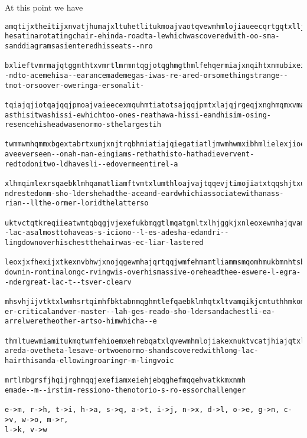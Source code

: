 At this point we have
  \begin{Verbatim}[frame=single,fontsize=\tiny]
amqtijxtheitijxnvatjhumajxltuhetlitukmoajvaotqvewmhmlojiaueecqrtgqtxlljtnhtrqtqjmximhmlajqqmtiqgbxhe
hesatinarotatingchair-ehinda-roadta-lewhichwascoveredwith-oo-sma-sanddiagramsasienteredhisseats--nro

bxlieftvmrmajqtggmthtxvmrtlmrmntqgjotqghmgthmlfehqermiajxnqihtxnmubixeifehqeewmhgeomhjxntgmhqextkjis
-ndto-acemehisa--earancemademegas-iwas-re-ared-orsomethingstrange--tnot-orsoover-oweringa-ersonalit-

tqiajqjiotqajqqjpmoajvaieecexmquhmtiatotsajqqjpmtxlajqjrgeqjxnghmqmxvmajqamtlotqmxehrebqiamkthnmqija
asthisitwashissi-ewhichtoo-ones-reathawa-hissi-eandhisim-osing-resencehisheadwasenormo-sthelargestih

twmmwmhqmmxbgextabrtxumjxnjtrqbhmiatiajqiegatiatljmwmhwmxibhmlielexjioebklatwmqkjggmlewmhrmmxijhmkst
aveeverseen--onah-man-eingiams-rethathisto-hathadievervent-redtodonitwo-ldhavesli--edovermeentirel-a

xlhmqimlexrsqaebklmhqamatliamftvmtxlumthloajvajtqqevjtimojiatxtqqshjtxubkkiamfehrmhfkehjliamktiimhqe
ndrestedonm-sho-ldershehadthe-aceand-eardwhichiassociatewithanass-rian--llthe-ormer-loridthelatterso

uktvctqtkreqiieatwmtqbqgjvjexefukbmqgtlmqatgmltxlhjggkjxnleoxewmhajqvamqiiamatjhotqgmvbkjthgktqimhml
-lac-asalmosttohaveas-s-iciono--l-es-adesha-edandri--lingdownoverhischestthehairwas-ec-liar-lastered

leoxjxfhexijxtkexnvbhwjxnojqgewmhajqrtqqjwmfehmamtliammsmqomhmukbmnhtsbxlmhnhmtiuktvcibfiqwmhsvkmthw
downin-rontinalongc-rvingwis-overhismassive-oreheadthee-eswere-l-egra--ndergreat-lac-t--tsver-clearv

mhsvhjijvtktxlwmhsrtqimhfbktabnmqghmtlefqaebklmhqtxltvamqikjcmtuthhmkomhmiameiamhgthiqefajroajvatggm
er-criticalandver-master--lah-ges-reado-sho-ldersandachestli-ea-arrelweretheother-artso-himwhicha--e

thmltuewmiamitukmqtwmfehioemxehrebqatxlqvewmhmlojiakexnuktvcatjhiajqtxltumkkeojxnhethjxnhbrukjxnwejv
areda-ovetheta-lesave-ortwoenormo-shandscoveredwithlong-lac-hairthisanda-ellowingroaringr-m-lingvoic

mrtlmbgrsfjhqijrghmqqjexefiamxeiehjebqghefmqqehvatkkmxnmh
emade--m--irstim-ressiono-thenotorio-s-ro-essorchallenger

e->m, r->h, t->i, h->a, s->q, a->t, i->j, n->x, d->l, o->e, g->n, c->v, w->o, m->r,
l->k, v->w
\end{Verbatim}

